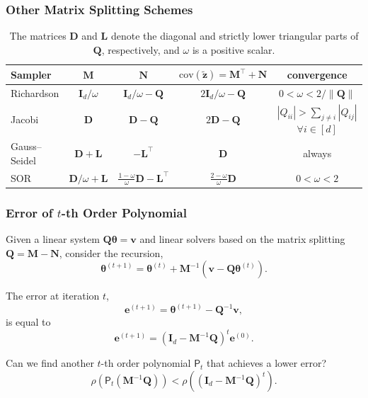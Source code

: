 \documentclass[aspectratio=169]{beamer}
\newcommand{\B}[1]{\mathbf{#1}} %
\newcommand{\Bs}[1]{\boldsymbol{#1}} %
\newcommand{\nr}[1]{\left\|#1\right\|} %
\begin{document}
\begin{frame}
\frametitle{Other Matrix Splitting Schemes}
\begin{table}
{\footnotesize
\caption{The matrices $\B{D}$ and $\B{L}$ denote the diagonal and strictly lower triangular parts of $\B{Q}$, respectively, and $\omega$ is a positive scalar.}
\begin{center}
{\renewcommand{\arraystretch}{1.5}
\begin{tabular}{|l|c|c|c|c|} 
    \hline
    \textbf{Sampler} & $\B{M}$ & $\B{N}$ & $\text{cov}(\tilde{\B{z}}) = \B{M}^{\top} + \B{N}$ & convergence\\
    \hline 
    Richardson & $\B{I}_d/\omega$ & $\B{I}_d/\omega - \B{Q}$ & $2\B{I}_d/\omega - \B{Q}$ & $0 < \omega < 2/\nr{\B{Q}}$\\ 
    Jacobi & $\B{D}$ & $\B{D} - \B{Q}$ & $2\B{D} - \B{Q}$ & $|Q_{ii}| > \sum_{j\neq i}|Q_{ij}|$ $\forall i \in [d]$\\
    Gauss--Seidel & $\B{D} + \B{L}$ & $-\B{L}^{\top}$ & $\B{D}$ & always\\
    SOR & $\B{D}/\omega + \B{L}$ & $\frac{1-\omega}{\omega}\B{D} - \B{L}^{\top}$ & $\frac{2-\omega}{\omega}\B{D}$ & $0 < \omega < 2$\\[1em]
    \hline
\end{tabular}}
\end{center}
}
\end{table}
\end{frame}

\begin{frame}
\frametitle{Error of $t$-th Order Polynomial}
Given a linear system $\B{Q}\Bs{\theta} = \B{v}$ and linear solvers based on the matrix splitting $\B{Q} = \B{M}-\B{N}$, consider the recursion,
\[\Bs{\theta}^{(t+1)} = \Bs{\theta}^{(t)} +  \B{M}^{-1}(\B{v}-\B{Q}\Bs{\theta}^{(t)}).\]

The error at iteration $t$,
\[\B{e}^{(t+1)} = \Bs{\theta}^{(t+1)} - \B{Q}^{-1}\B{v},\]
is equal to 
\[\B{e}^{(t+1)} = (\B{I}_d-\B{M}^{-1}\B{Q})^t\B{e}^{(0)}.\]

Can we find another $t$-th order polynomial $\mathsf{P}_t$ that achieves a lower error?
\[\rho(\mathsf{P}_t(\B{M}^{-1}\B{Q})) < \rho((\B{I}_d-\B{M}^{-1}\B{Q})^t).\]
\end{frame}
\end{document}
